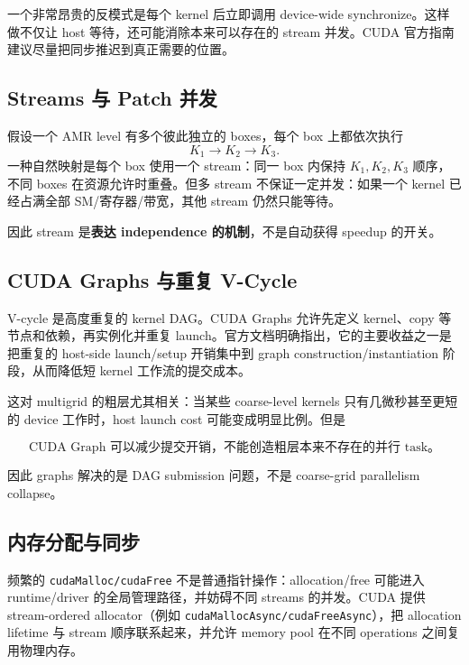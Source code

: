 一个非常昂贵的反模式是每个 kernel 后立即调用 device-wide synchronize。这样做不仅让 host 等待，还可能消除本来可以存在的 stream 并发。CUDA 官方指南建议尽量把同步推迟到真正需要的位置\cite{cudaProgramming2026}。

\subsection{Streams 与 Patch 并发}

假设一个 AMR level 有多个彼此独立的 boxes，每个 box 上都依次执行
\[
K_1\rightarrow K_2\rightarrow K_3.
\]
一种自然映射是每个 box 使用一个 stream：同一 box 内保持 $K_1,K_2,K_3$ 顺序，不同 boxes 在资源允许时重叠。但多 stream 不保证一定并发：如果一个 kernel 已经占满全部 SM/寄存器/带宽，其他 stream 仍然只能等待。

因此 stream 是\textbf{表达 independence 的机制}，不是自动获得 speedup 的开关。

\subsection{CUDA Graphs 与重复 V-Cycle}

V-cycle 是高度重复的 kernel DAG。CUDA Graphs 允许先定义 kernel、copy 等节点和依赖，再实例化并重复 launch。官方文档明确指出，它的主要收益之一是把重复的 host-side launch/setup 开销集中到 graph construction/instantiation 阶段，从而降低短 kernel 工作流的提交成本\cite{cudaProgramming2026}。

这对 multigrid 的粗层尤其相关：当某些 coarse-level kernels 只有几微秒甚至更短的 device 工作时，host launch cost 可能变成明显比例。但是

\begin{equation}
\boxed{
\text{CUDA Graph 可以减少提交开销，不能创造粗层本来不存在的并行 task。}
}
\label{eq:gpu-graph-limit}
\end{equation}

因此 graphs 解决的是 DAG submission 问题，不是 coarse-grid parallelism collapse。

\subsection{内存分配与同步}

频繁的 \texttt{cudaMalloc/cudaFree} 不是普通指针操作：allocation/free 可能进入 runtime/driver 的全局管理路径，并妨碍不同 streams 的并发。CUDA 提供 stream-ordered allocator（例如 \texttt{cudaMallocAsync/cudaFreeAsync}），把 allocation lifetime 与 stream 顺序联系起来，并允许 memory pool 在不同 operations 之间复用物理内存\cite{cudaProgramming2026}。

